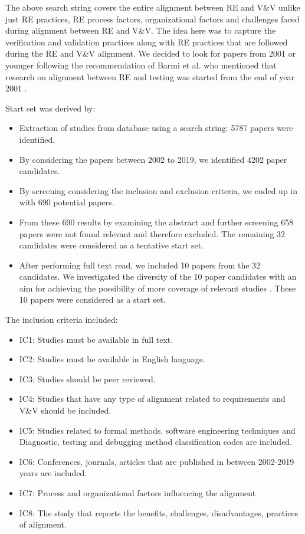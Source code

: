 \documentclass{article}
\begin{document}
The above search string covers the entire alignment between RE and V\&V unlike just RE practices, RE process factors, organizational factors and challenges faced during alignment between RE and V\&V. The idea here was to capture the verification and validation practices along with RE practices that are followed during the RE and V\&V alignment. We decided to look for papers from 2001 or younger following the recommendation of Barmi et al. who mentioned that research on alignment between RE and testing was started from the end of year 2001 \cite{barmi2011alignmentS1}.

Start set was derived by:
\begin{itemize}
    \item Extraction of studies from database using a search string: 5787 papers were identified.
    \item By considering the papers between 2002 to 2019, we identified 4202 paper candidates.
    \item By screening considering the inclusion and exclusion criteria, we ended up in with 690 potential papers.
    \item From these 690 results by examining the abstract and further screening 658 papers were not found relevant and therefore excluded. The remaining 32 candidates were considered as a tentative start set.
    \item After performing full text read, we included 10 papers from the 32 candidates. We investigated the diversity of the 10 paper candidates with an aim for achieving the possibility of more coverage of relevant studies \cite{wohlin2014guidelines}. These 10 papers were considered as a start set. 
\end{itemize}
The inclusion criteria included:
\begin{itemize}
    \item IC1: Studies must be available in full text.
    \item IC2: Studies must be available in English language.
    \item IC3: Studies should be peer reviewed.
    \item IC4: Studies that have any type of alignment related to requirements and   V\&V should be included.
    \item IC5: Studies related to formal methods, software engineering techniques and Diagnostic, testing and debugging method classification codes are included.
    \item IC6: Conferences, journals, articles that are published in between 2002-2019 years are included.
    \item IC7: Process and organizational factors influencing the alignment 
    \item IC8: The study that reports the benefits, challenges, disadvantages, practices of alignment.

\end{itemize}
\end{document}
